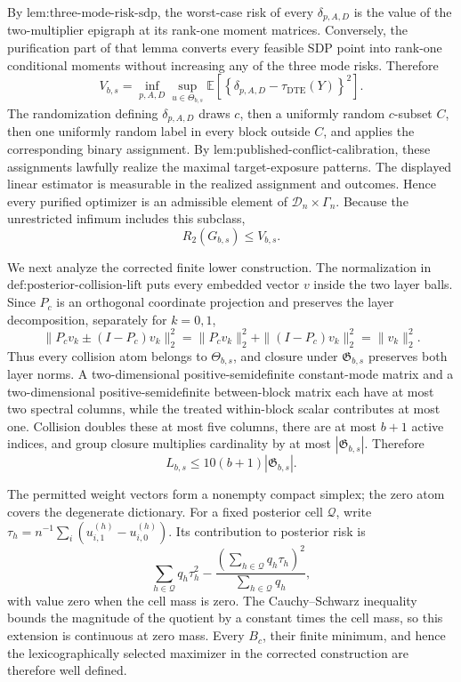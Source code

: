By \(\text{lem:three-mode-risk-sdp}\), the worst-case risk of every \(\delta_{p,A,D}\) is the value of the two-multiplier epigraph at its rank-one moment matrices.  Conversely, the purification part of that lemma converts every feasible SDP point into rank-one conditional moments without increasing any of the three mode risks.  Therefore
\[
V_{b,s}=\inf_{p,A,D}\sup_{u\in\Theta_{b,s}}
\mathbb E\!\left[\left\{\delta_{p,A,D}-\tau_{\mathrm{DTE}}(Y)\right\}^2\right].
\]
The randomization defining \(\delta_{p,A,D}\) draws \(c\), then a uniformly random \(c\)-subset \(C\), then one uniformly random label in every block outside \(C\), and applies the corresponding binary assignment.  By \(\text{lem:published-conflict-calibration}\), these assignments lawfully realize the maximal target-exposure patterns.  The displayed linear estimator is measurable in the realized assignment and outcomes.  Hence every purified optimizer is an admissible element of \(\mathcal D_n\times\Gamma_n\).  Because the unrestricted infimum includes this subclass,
\[
R_2(G_{b,s})\le V_{b,s}.
\]

We next analyze the corrected finite lower construction.  The normalization in \(\text{def:posterior-collision-lift}\) puts every embedded vector \(v\) inside the two layer balls.  Since \(P_c\) is an orthogonal coordinate projection and preserves the layer decomposition, separately for \(k=0,1\),
\[
\|P_cv_k\pm(I-P_c)v_k\|_2^2
=\|P_cv_k\|_2^2+\|(I-P_c)v_k\|_2^2
=\|v_k\|_2^2.
\]
Thus every collision atom belongs to \(\Theta_{b,s}\), and closure under \(\mathfrak G_{b,s}\) preserves both layer norms.  A two-dimensional positive-semidefinite constant-mode matrix and a two-dimensional positive-semidefinite between-block matrix each have at most two spectral columns, while the treated within-block scalar contributes at most one.  Collision doubles these at most five columns, there are at most \(b+1\) active indices, and group closure multiplies cardinality by at most \(|\mathfrak G_{b,s}|\).  Therefore
\[
L_{b,s}\le10(b+1)|\mathfrak G_{b,s}|.
\]

The permitted weight vectors form a nonempty compact simplex; the zero atom covers the degenerate dictionary.  For a fixed posterior cell \(\mathcal Q\), write \(\tau_h=n^{-1}\sum_i(u^{(h)}_{i,1}-u^{(h)}_{i,0})\).  Its contribution to posterior risk is
\[
\sum_{h\in\mathcal Q}q_h\tau_h^2
-\frac{\left(\sum_{h\in\mathcal Q}q_h\tau_h\right)^2}
{\sum_{h\in\mathcal Q}q_h},
\]
with value zero when the cell mass is zero.  The Cauchy--Schwarz inequality bounds the magnitude of the quotient by a constant times the cell mass, so this extension is continuous at zero mass.  Every \(B_c\), their finite minimum, and hence the lexicographically selected maximizer in the corrected construction are therefore well defined.

